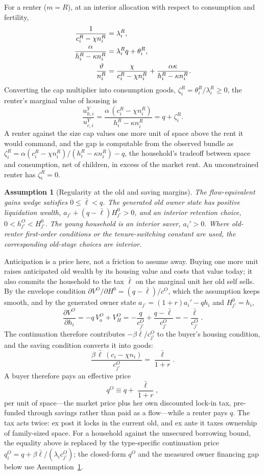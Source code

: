 \documentclass[11pt]{article}
\newtheorem{assumption}{Assumption}
\newcommand{\1}{\mathbf 1}
\begin{document}
For a renter ($m=R$), at an interior allocation with respect to consumption and fertility,
\begin{align}
\frac{1}{c_i^R-\chi n_i^R}&=\lambda_i^R,
\notag\\
\frac{\alpha}{h_i^R-\kappa n_i^R}&=\lambda_i^R q+\theta_i^R,
\notag\\
\frac{\vartheta}{n_i^R}&=\frac{\chi}{c_i^R-\chi n_i^R}+\frac{\alpha\kappa}{h_i^R-\kappa n_i^R}.
\label{eq:compact_renter_foc_n}
\end{align}
Converting the cap multiplier into consumption goods, $\zeta_i^R=\theta_i^R/\lambda_i^R\ge0$, the renter's marginal value of housing is
\begin{equation}
\frac{u^Y_{h,i}}{u^Y_{c,i}}
=
\frac{\alpha\,(c_i^R-\chi n_i^R)}{h_i^R-\kappa n_i^R}
=
q+\zeta_i^R.
\label{eq:compact_renter_mv}
\end{equation}
A renter against the size cap values one more unit of space above the rent it would command, and the gap is computable from the observed bundle as $\zeta_i^R=\alpha(c_i^R-\chi n_i^R)/(h_i^R-\kappa n_i^R)-q$, the household's tradeoff between space and consumption, net of children, in excess of the market rent. An unconstrained renter has $\zeta_i^R=0$.

\begin{assumption}[Regularity at the old and saving margins]
\label{ass:carry_neutral}
The flow-equivalent gains wedge satisfies $0\le\bar\ell<q$. The generated old owner state has positive liquidation wealth, $a_{j'}+(q-\bar\ell)H_{j'}^0>0$, and an interior retention choice, $0<h_{j'}^O<H_{j'}^0$. The young household is an interior saver, $a_i'>0$. Where old-renter first-order conditions or the tenure-switching constant are used, the corresponding old-stage choices are interior.
\end{assumption}

Anticipation is a price here, not a friction to assume away. Buying one more unit raises anticipated old wealth by its housing value and costs that value today; it also commits the household to the tax $\bar\ell$ on the marginal unit her old self sells. By the envelope condition $\partial V^O/\partial H^0=(q-\bar\ell)/c^O$, which the assumption keeps smooth, and by the generated owner state $a_{j'}=(1+r)a_i'-q h_i$ and $H_{j'}^0=h_i$,
\[
\frac{\partial V^O}{\partial h_i}
=
-q\,V_a^O+V_H^O
=
-\frac{q}{c_{j'}^O}+\frac{q-\bar\ell}{c_{j'}^O}
=
-\frac{\bar\ell}{c_{j'}^O}.
\]
The continuation therefore contributes $-\beta\bar\ell/c_{j'}^O$ to the buyer's housing condition, and the saving condition converts it into goods:
\[
\frac{\beta\,\bar\ell\,(c_i-\chi n_i)}{c_{j'}^O}=\frac{\bar\ell}{1+r}.
\]
A buyer therefore pays an effective price
\[
q^O\equiv q+\frac{\bar\ell}{1+r},
\]
per unit of space---the market price plus her own discounted lock-in tax, pre-funded through savings rather than paid as a flow---while a renter pays $q$. The tax acts twice: ex post it locks in the current old, and ex ante it taxes ownership of family-sized space.
For a household against the unsecured borrowing bound, the equality above is replaced by the type-specific continuation price $q_i^O=q+\beta\bar\ell/(\lambda_i c_{j'}^O)$; the closed-form $q^O$ and the measured owner financing gap below use Assumption~\ref{ass:carry_neutral}.
\end{document}
